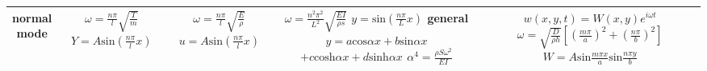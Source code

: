 \documentclass{article}
\begin{document}
\begin{multicols*}{3}
\begin{table*}
\begin{tabular}{|c|c|c|c|c|}
      \hline
      \makecell[c]{normal\\ mode}& \makecell[c]{$\omega=\frac{n\pi}{l}\sqrt{\frac{T}{m}}$ \\$Y=A \text{sin}(\frac{n\pi}{l}x)$}
      &\makecell[c]{$\omega=\frac{n\pi}{l}\sqrt{\frac{E}{\rho}}$\\ $u=A \text{sin}(\frac{n\pi}{l}x)$}
      &\makecell[c]{
        $\omega=\frac{n^{2}\pi^{2}}{L^{2}}\sqrt{\frac{EI}{\rho s}}$
        $y=\text{sin}(\frac{n \pi}{L}x)$\\
        general $y=a\text{cos}\alpha x+b\text{sin}\alpha x$\\
        $+c \text{cosh}\alpha x+d \text{sinh}\alpha x$\\
        $\alpha^4 = \frac{\rho S \omega^2}{EI}$  
      }
      &\makecell[c]{
        $w(x,y,t)=W(x,y)e^{i\omega t}$\\
        $\omega=\sqrt{\frac{D}{\rho h}}[(\frac{m\pi}{a})^{2}+(\frac{n \pi}{b})^{2}]$\\
        $W=A\text{sin}\frac{m\pi x}{a}\text{sin}\frac{n \pi y}{b}$
      }\\
      \hline
    \end{tabular}
  \end{table*}




\end{multicols*}
\end{document}
